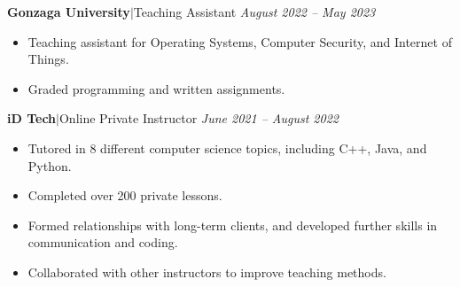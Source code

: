\documentclass[11pt, a4paper, roman]{moderncv}
\newcommand{\entry}[4]{
	\textbf{#1}\:$|$\:#2 
	\hfill\textit{#3}
	#4
	\vspace{2mm}
}
\begin{document}
\entry{Gonzaga University}{Teaching Assistant}{August 2022 -- May 2023}
{\begin{itemize}
	\item Teaching assistant for Operating Systems, Computer Security, and Internet of Things.
	\item Graded programming and written assignments.
\end{itemize}
}

\entry{iD Tech}{Online Private Instructor}{June 2021 -- August 2022}
{\begin{itemize}
    \item Tutored in 8 different computer science topics, including C++, Java, and Python.
    \item Completed over 200 private lessons.
    \item Formed relationships with long-term clients, and developed further skills in communication and coding.
    \item Collaborated with other instructors to improve teaching methods.
  \end{itemize}
}


\end{document}
